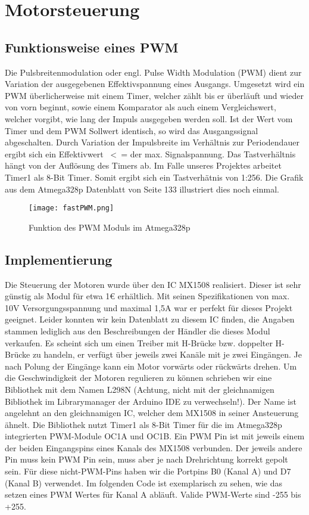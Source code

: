\documentclass{article}
\begin{document}
\section{Motorsteuerung} %
\subsection{Funktionsweise eines PWM}
Die Pulsbreitenmodulation oder engl. Pulse Width Modulation (PWM) dient zur Variation der ausgegebenen Effektivspannung eines Ausgangs. Umgesetzt wird ein PWM überlicherweise mit einem Timer, welcher zählt bis er überläuft und wieder von vorn beginnt, sowie einem Komparator als auch einem Vergleichswert, welcher vorgibt, wie lang der Impuls ausgegeben werden soll. Ist der Wert vom Timer und dem PWM Sollwert identisch, so wird das Ausgangssignal abgeschalten.
Durch Variation der Impulsbreite im Verhältnis zur Periodendauer ergibt sich ein Effektivwert \ <\ = der max. Signalspannung. Das Tastverhältnis hängt von der Auflösung des Timers ab. Im Falle unseres Projektes arbeitet Timer1 als 8-Bit Timer. Somit ergibt sich ein Tastverhätnis von 1:256.
Die Grafik aus dem Atmega328p Datenblatt von Seite 133 illustriert dies noch einmal.

\begin{figure}[h]
	\texttt{[image: fastPWM.png]}
	\centering
	\caption{Funktion des PWM Moduls im Atmega328p} \cite{fastPWM}
\end{figure}


\subsection{Implementierung}
Die Steuerung der Motoren wurde über den IC MX1508 realisiert. Dieser ist sehr günstig als Modul für etwa 1€ erhältlich.
Mit seinen Spezifikationen von max. 10V Versorgungsspannung und maximal 1,5A war er perfekt für dieses Projekt geeignet.
Leider konnten wir kein Datenblatt zu diesem IC finden, die Angaben stammen lediglich aus den Beschreibungen der Händler die dieses Modul verkaufen.
Es scheint sich um einen Treiber mit H-Brücke bzw. doppelter H-Brücke zu handeln, er verfügt über jeweils zwei Kanäle mit je zwei Eingängen. Je nach Polung der Eingänge kann ein Motor vorwärts oder rückwärts drehen.
Um die Geschwindigkeit der Motoren regulieren zu können schrieben wir eine Bibliothek mit dem Namen L298N (Achtung, nicht mit der gleichnamigen Bibliothek im Librarymanager der Arduino IDE zu verwechseln!).
Der Name ist angelehnt an den gleichnamigen IC, welcher dem MX1508 in seiner Ansteuerung ähnelt.
Die Bibliothek nutzt Timer1 als 8-Bit Timer für die im Atmega328p integrierten PWM-Module OC1A und OC1B.
Ein PWM Pin ist mit jeweils einem der beiden Eingangspins eines Kanals des MX1508 verbunden. Der jeweils andere Pin muss kein PWM Pin sein, muss aber je nach Drehrichtung korrekt gepolt sein. Für diese nicht-PWM-Pins haben wir die Portpins B0 (Kanal A) und D7 (Kanal B) verwendet.
\newline
Im folgenden Code ist exemplarisch zu sehen, wie das setzen eines PWM Wertes für Kanal A abläuft. Valide PWM-Werte sind -255 bis +255.
\end{document}

